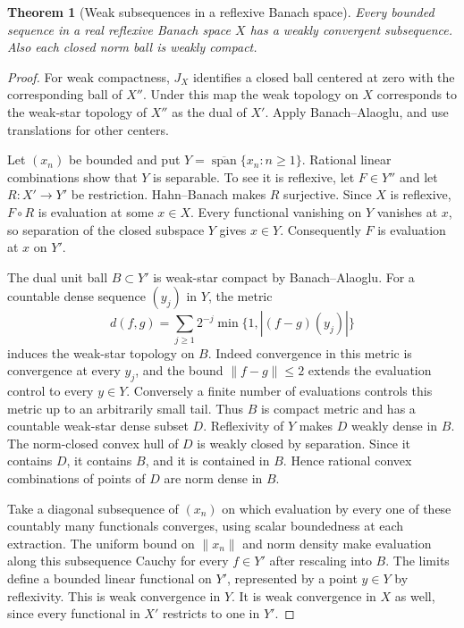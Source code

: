\documentclass[11pt,oneside,openany]{book}
\theoremstyle{plain}
\newtheorem{theorem}{Theorem}[chapter]
\theoremstyle{definition}
\theoremstyle{remark}
\begin{document}
\begin{theorem}[Weak subsequences in a reflexive Banach space]
\label{thm:reflexive-weak-subsequence}
Every bounded sequence in a real reflexive Banach space \(X\) has a weakly
convergent subsequence. Also each closed norm ball is weakly compact.
\end{theorem}
\begin{proof}
For weak compactness, \(J_X\) identifies a closed ball centered at zero
with the corresponding ball of \(X''\). Under this map the weak topology
on \(X\) corresponds to the weak-star topology of \(X''\) as the dual
of \(X'\). Apply Banach--Alaoglu, and use translations for other centers.

Let \((x_n)\) be bounded and put
\(Y=\overline{\operatorname{span}}\{x_n:n\ge1\}\). Rational linear
combinations show that \(Y\) is separable. To see it is reflexive, let
\(F\in Y''\) and let \(R:X'\to Y'\) be restriction. Hahn--Banach
makes \(R\) surjective. Since \(X\) is reflexive, \(F\circ R\) is evaluation
at some \(x\in X\). Every functional vanishing on \(Y\) vanishes at \(x\),
so separation of the closed subspace \(Y\) gives \(x\in Y\).
Consequently \(F\) is evaluation at \(x\) on \(Y'\).

The dual unit ball \(B\subset Y'\) is weak-star compact by Banach--Alaoglu.
For a countable dense sequence \((y_j)\) in \(Y\), the metric
\[
 d(f,g)=\sum_{j\ge1}2^{-j}\min\{1,|(f-g)(y_j)|\}
\]
induces the weak-star topology on \(B\). Indeed convergence in this metric
is convergence at every \(y_j\), and the bound \(\|f-g\|\le2\) extends
the evaluation control to every \(y\in Y\). Conversely a finite number of
evaluations controls this metric up to an arbitrarily small tail.
Thus \(B\) is compact metric and has a countable weak-star dense subset
\(D\). Reflexivity of \(Y\) makes \(D\) weakly dense in \(B\).
The norm-closed convex hull of \(D\) is weakly closed by separation.
Since it contains \(D\), it contains \(B\), and it is contained in \(B\).
Hence rational convex combinations of points of \(D\) are norm dense in
\(B\).

Take a diagonal subsequence of \((x_n)\) on which evaluation by every
one of these countably many functionals converges, using scalar boundedness
at each extraction. The uniform bound on \(\|x_n\|\) and norm density
make evaluation along this subsequence Cauchy for every \(f\in Y'\)
after rescaling into \(B\). The limits define a bounded linear functional
on \(Y'\), represented by a point \(y\in Y\) by reflexivity. This is weak
convergence in \(Y\). It is weak convergence in \(X\) as well, since every
functional in \(X'\) restricts to one in \(Y'\).
\end{proof}
\end{document}
